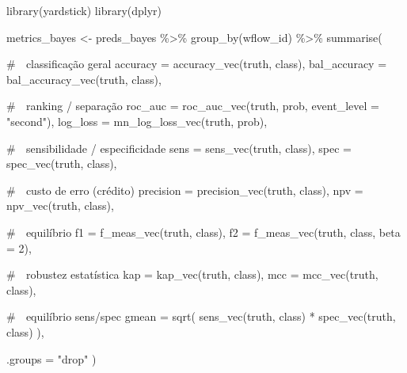 \documentclass[
  letterpaper,
  DIV=11,
  numbers=noendperiod]{scrartcl}
\newenvironment{Shaded}{\begin{snugshade}}{\end{snugshade}}
\newcommand{\AttributeTok}[1]{\textcolor[rgb]{0.40,0.45,0.13}{#1}}
\newcommand{\CommentTok}[1]{\textcolor[rgb]{0.37,0.37,0.37}{#1}}
\newcommand{\DecValTok}[1]{\textcolor[rgb]{0.68,0.00,0.00}{#1}}
\newcommand{\FunctionTok}[1]{\textcolor[rgb]{0.28,0.35,0.67}{#1}}
\newcommand{\NormalTok}[1]{\textcolor[rgb]{0.00,0.23,0.31}{#1}}
\newcommand{\OtherTok}[1]{\textcolor[rgb]{0.00,0.23,0.31}{#1}}
\newcommand{\SpecialCharTok}[1]{\textcolor[rgb]{0.37,0.37,0.37}{#1}}
\newcommand{\StringTok}[1]{\textcolor[rgb]{0.13,0.47,0.30}{#1}}
\begin{document}
\begin{Shaded}
\begin{Highlighting}[]
\FunctionTok{library}\NormalTok{(yardstick)}
\FunctionTok{library}\NormalTok{(dplyr)}

\NormalTok{metrics\_bayes }\OtherTok{\textless{}{-}}\NormalTok{ preds\_bayes }\SpecialCharTok{\%\textgreater{}\%}
  \FunctionTok{group\_by}\NormalTok{(wflow\_id) }\SpecialCharTok{\%\textgreater{}\%}
  \FunctionTok{summarise}\NormalTok{(}

    \CommentTok{\# 📌 classificação geral}
    \AttributeTok{accuracy =} \FunctionTok{accuracy\_vec}\NormalTok{(truth, class),}
    \AttributeTok{bal\_accuracy =} \FunctionTok{bal\_accuracy\_vec}\NormalTok{(truth, class),}

    \CommentTok{\# 📌 ranking / separação}
    \AttributeTok{roc\_auc =} \FunctionTok{roc\_auc\_vec}\NormalTok{(truth, prob, }\AttributeTok{event\_level =} \StringTok{"second"}\NormalTok{),}
    \AttributeTok{log\_loss =} \FunctionTok{mn\_log\_loss\_vec}\NormalTok{(truth, prob),}

    \CommentTok{\# 📌 sensibilidade / especificidade}
    \AttributeTok{sens =} \FunctionTok{sens\_vec}\NormalTok{(truth, class),}
    \AttributeTok{spec =} \FunctionTok{spec\_vec}\NormalTok{(truth, class),}

    \CommentTok{\# 📌 custo de erro (crédito)}
    \AttributeTok{precision =} \FunctionTok{precision\_vec}\NormalTok{(truth, class),}
    \AttributeTok{npv =} \FunctionTok{npv\_vec}\NormalTok{(truth, class),}

    \CommentTok{\# 📌 equilíbrio}
    \AttributeTok{f1 =} \FunctionTok{f\_meas\_vec}\NormalTok{(truth, class),}
    \AttributeTok{f2 =} \FunctionTok{f\_meas\_vec}\NormalTok{(truth, class, }\AttributeTok{beta =} \DecValTok{2}\NormalTok{),}

    \CommentTok{\# 📌 robustez estatística}
    \AttributeTok{kap =} \FunctionTok{kap\_vec}\NormalTok{(truth, class),}
    \AttributeTok{mcc =} \FunctionTok{mcc\_vec}\NormalTok{(truth, class),}

    \CommentTok{\# 📌 equilíbrio sens/spec}
    \AttributeTok{gmean =} \FunctionTok{sqrt}\NormalTok{(}
      \FunctionTok{sens\_vec}\NormalTok{(truth, class) }\SpecialCharTok{*} \FunctionTok{spec\_vec}\NormalTok{(truth, class)}
\NormalTok{    ),}

    \AttributeTok{.groups =} \StringTok{"drop"}
\NormalTok{  )}
\end{Highlighting}
\end{Shaded}
\end{document}
